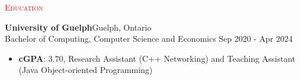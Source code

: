 \documentclass[a4paper]{article}
\newcommand{\lineunder} {
    \vspace*{-8pt} \\
    \hspace*{-18pt} \hrulefill \\
}
\newcommand{\header} [1] {
    {\hspace*{-18pt}\vspace*{6pt} \textsc{#1}}
    \vspace*{-6pt} {\color{red}{\lineunder}}
}
\begin{document}
\vspace{-1.25mm}

\header{{\faBuildingO} \textcolor{red}{Education}}
\textbf{University of Guelph}\hfill Guelph, Ontario\\
Bachelor of Computing, Computer Science and Economics \hfill Sep 2020 - Apr 2024\\
\begin{itemize} \itemsep 1pt \vspace{-2.5mm}
     \item \textbf{cGPA}: $3.70$, Research Assistant (C++ Networking) and Teaching Assistant (Java Object-oriented Programming)
 \end{itemize}
 \vspace{-3mm}
\end{document}

